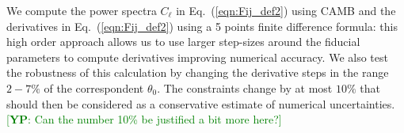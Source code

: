 \documentclass[aps,prd,reprint,superscriptaddress]{revtex4-1}
\newcommand{\yp}[1]{\textcolor{green}{[{\bf YP}: #1]}}
\newcommand\refeq[1]{Eq.~(\ref{eqn:#1})}
\begin{document}
We compute the power spectra $C_{\ell}$ in \refeq{Fij_def2} using CAMB \cite{Howlett:2012mh,Lewis:1999bs} and
the derivatives in \refeq{Fij_def2} using a 5 points finite difference formula:
this high order approach allows us to use larger step-sizes around the fiducial parameters to compute derivatives improving numerical accuracy.
We also test the robustness of this calculation by changing the derivative steps in the range $2-7\%$ of the correspondent $\theta_{0}$. The constraints change by at most $10\%$ that should then be considered as a conservative estimate of numerical uncertainties. \yp{Can the number 10\% be justified a bit more here?}
\end{document}
